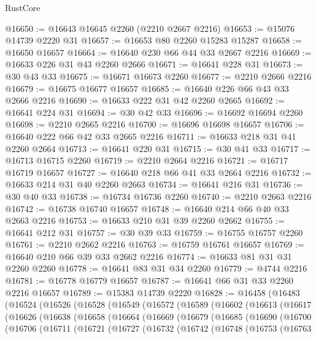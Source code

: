 \begin{lexlean}{RustCore}
\begin{coremodule}
@16650 := @16643 @16645 @2260 (@2210 @2667 @2216)
@16653 := @15076 @14739 @2220 @31
@16657 := @16653 @80 @2260 @15283 @15287
@16658 := @16650 @16657
@16664 := @16640 @230 @66 @44 @33 @2667 @2216
@16669 := @16633 @226 @31 @43 @2260 @2666
@16671 := @16641 @228 @31
@16673 := @30 @43 @33
@16675 := @16671 @16673 @2260
@16677 := @2210 @2666 @2216
@16679 := @16675 @16677 @16657
@16685 := @16640 @226 @66 @43 @33 @2666 @2216
@16690 := @16633 @222 @31 @42 @2260 @2665
@16692 := @16641 @224 @31
@16694 := @30 @42 @33
@16696 := @16692 @16694 @2260
@16698 := @2210 @2665 @2216
@16700 := @16696 @16698 @16657
@16706 := @16640 @222 @66 @42 @33 @2665 @2216
@16711 := @16633 @218 @31 @41 @2260 @2664
@16713 := @16641 @220 @31
@16715 := @30 @41 @33
@16717 := @16713 @16715 @2260
@16719 := @2210 @2664 @2216
@16721 := @16717 @16719 @16657
@16727 := @16640 @218 @66 @41 @33 @2664 @2216
@16732 := @16633 @214 @31 @40 @2260 @2663
@16734 := @16641 @216 @31
@16736 := @30 @40 @33
@16738 := @16734 @16736 @2260
@16740 := @2210 @2663 @2216
@16742 := @16738 @16740 @16657
@16748 := @16640 @214 @66 @40 @33 @2663 @2216
@16753 := @16633 @210 @31 @39 @2260 @2662
@16755 := @16641 @212 @31
@16757 := @30 @39 @33
@16759 := @16755 @16757 @2260
@16761 := @2210 @2662 @2216
@16763 := @16759 @16761 @16657
@16769 := @16640 @210 @66 @39 @33 @2662 @2216
@16774 := @16633 @81 @31 @31 @2260 @2260
@16778 := @16641 @83 @31 @34 @2260
@16779 := @4744 @2216
@16781 := @16778 @16779 @16657
@16787 := @16641 @66 @31 @33 @2260 @2216 @16657
@16789 := @15383 @14739 @2220
@16828 := @16458
    (@16483
      (@16524
        (@16526
          (@16528
            (@16549
              (@16572
                (@16589
                  (@16602
                    (@16613
                      (@16617
                        (@16626
                          (@16638
                            (@16658
                              (@16664
                                (@16669
                                  (@16679
                                    (@16685
                                      (@16690
                                        (@16700
                                          (@16706
                                            (@16711
                                              (@16721
                                                (@16727
                                                  (@16732
                                                    (@16742
                                                      (@16748
                                                        (@16753
                                                          (@16763

\end{coremodule}
\end{lexlean}

